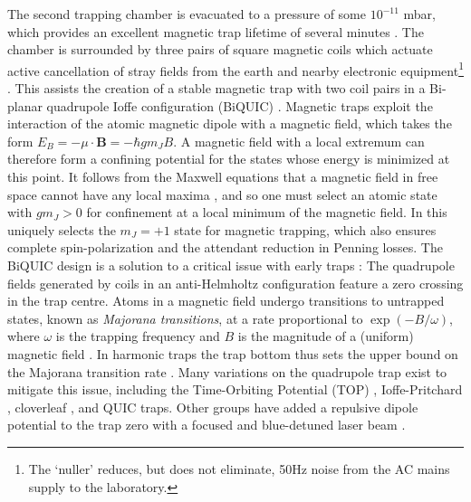 	The second trapping chamber is evacuated to a pressure of some $10^{-11}$ mbar, which provides an excellent magnetic trap lifetime of several minutes . The chamber is surrounded by three pairs of square magnetic coils which actuate active cancellation of stray fields from the earth and nearby electronic equipment\footnote{The `nuller' reduces, but does not eliminate, 50Hz noise from the AC mains supply to the laboratory.} \cite{dedman07}. This assists the creation of a stable magnetic trap with two coil pairs in a Bi-planar quadrupole Ioffe configuration (BiQUIC) \cite{dall07}. Magnetic traps exploit the interaction of the atomic magnetic dipole with a magnetic field, which takes the form $E_B = -\mu\cdot \textbf{B} = -\hbar g m_J B$. A magnetic field with a local extremum can therefore form a confining potential for the states whose energy is minimized at this point. It follows from the Maxwell equations that a magnetic field in free space cannot have any local maxima \cite{MakingProbingUnderstanding}, and so one must select an atomic state with $g m_J>0$ for confinement at a local minimum of the magnetic field. In \mhe this uniquely selects the $m_J=+1$ state for magnetic trapping, which also ensures complete spin-polarization and the attendant reduction in Penning losses. The BiQUIC design is a solution to a critical issue with early traps \cite{migdall85}: The quadrupole fields generated by coils in an anti-Helmholtz configuration feature a zero crossing in the trap centre. Atoms in a magnetic field undergo transitions to untrapped states, known as \emph{Majorana transitions}, at a rate proportional to $\exp(-B/\omega)$, where $\omega$ is the trapping frequency and $B$ is the magnitude of a (uniform) magnetic field \cite{sukumar97}. In harmonic traps the trap bottom thus sets the upper bound on the Majorana transition rate \cite{brink06}. Many variations on the quadrupole trap exist to mitigate this issue, including the Time-Orbiting Potential (TOP) \cite{petrich95}, Ioffe-Pritchard \cite{pritchard83}, cloverleaf \cite{mewes97}, and QUIC \cite{esslinger98} traps. Other groups have added a repulsive dipole potential to the trap zero with a focused and blue-detuned laser beam \cite{papers}. 

